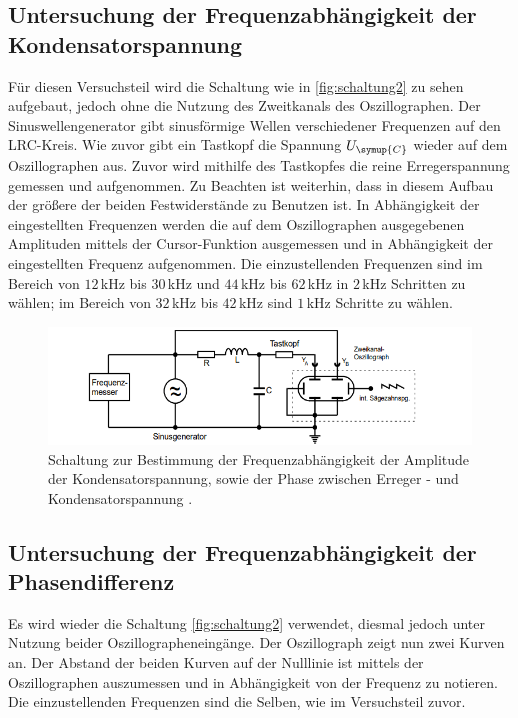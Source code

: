     \subsection{Untersuchung der Frequenzabhängigkeit der Kondensatorspannung}
        Für diesen Versuchsteil wird die Schaltung wie in \autoref{fig:schaltung2} zu sehen aufgebaut, jedoch ohne die Nutzung des Zweitkanals des Oszillographen.
        Der Sinuswellengenerator gibt sinusförmige Wellen verschiedener Frequenzen auf den LRC-Kreis. Wie zuvor gibt ein Tastkopf die Spannung $U_{\symup{C}}$
        wieder auf dem Oszillographen aus. Zuvor wird mithilfe des Tastkopfes die reine Erregerspannung gemessen und aufgenommen. Zu Beachten 
        ist weiterhin, dass in diesem Aufbau der größere der beiden Festwiderstände zu Benutzen ist. In Abhängigkeit der eingestellten Frequenzen
        werden die auf dem Oszillographen ausgegebenen Amplituden mittels der Cursor-Funktion ausgemessen und in Abhängigkeit der eingestellten
        Frequenz aufgenommen. Die einzustellenden Frequenzen sind im Bereich von $12$\,kHz bis $30$\,kHz und $44$\,kHz bis $62$\,kHz in $2$\,kHz Schritten zu wählen;
        im Bereich von $32$\,kHz bis $42$\,kHz sind $1$\,kHz Schritte zu wählen.
        \begin{figure}
            \centering
            \includegraphics[width=\textwidth]{content/s2.png}
            \caption{Schaltung zur Bestimmung der Frequenzabhängigkeit der Amplitude der Kondensatorspannung, sowie der Phase zwischen Erreger - und Kondensatorspannung \cite[296]{V354}.}
            \label{fig:schaltung2}
        \end{figure} 
    \subsection{Untersuchung der Frequenzabhängigkeit der Phasendifferenz}
        Es wird wieder die Schaltung \autoref{fig:schaltung2} verwendet, diesmal jedoch unter Nutzung beider Oszillographeneingänge. Der Oszillograph
        zeigt nun zwei Kurven an. Der Abstand der beiden Kurven auf der Nulllinie ist mittels der Oszillographen auszumessen und in 
        Abhängigkeit von der Frequenz zu notieren. Die einzustellenden Frequenzen sind die Selben, wie im Versuchsteil zuvor.    
